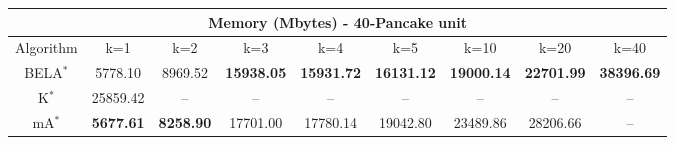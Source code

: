 \begin{tabular}{c|cccccccc}\toprule
\multicolumn{9}{c}{Memory (Mbytes) - 40-Pancake unit}\\ \midrule
Algorithm & k=1 & k=2 & k=3 & k=4 & k=5 & k=10 & k=20 & k=40 \\ \midrule
BELA$^*$ & 5778.10 & 8969.52 & \textbf{15938.05} & \textbf{15931.72} & \textbf{16131.12} & \textbf{19000.14} & \textbf{22701.99} & \textbf{38396.69} \\
K$^*$ & 25859.42 & -- & -- & -- & -- & -- & -- & -- \\
mA$^*$ & \textbf{5677.61} & \textbf{8258.90} & 17701.00 & 17780.14 & 19042.80 & 23489.86 & 28206.66 & -- \\ \bottomrule 
\end{tabular}
